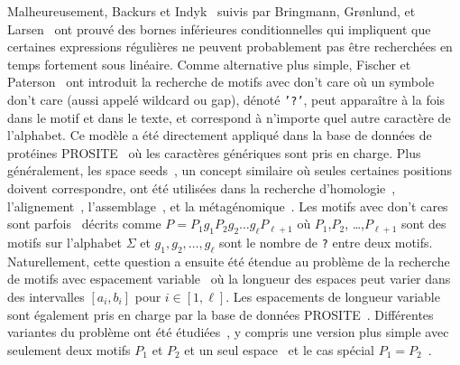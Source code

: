 Malheureusement, Backurs et Indyk~\cite{DBLP:conf/focs/BackursI16} suivis par Bringmann, Gr{\o}nlund, et Larsen~\cite{8104068} ont prouvé des bornes inférieures conditionnelles qui impliquent que certaines expressions régulières ne peuvent probablement pas être recherchées en temps fortement sous linéaire.
Comme alternative plus simple, Fischer et Paterson~\cite{FischerPaterson} ont introduit la recherche de motifs avec \og{}don't care\fg{} où un symbole don't care (aussi appelé wildcard ou gap), dénoté \texttt{'?'}, peut apparaître à la fois dans le motif et dans le texte, et correspond à n'importe quel autre caractère de l'alphabet.
Ce modèle a été directement appliqué dans la base de données de protéines PROSITE~\cite{hulo2006prosite} où les caractères génériques sont pris en charge. Plus généralement, les space seeds~\cite{li2004patternhunter}, un concept similaire où seules certaines positions doivent correspondre, ont été utilisées dans la recherche d'homologie~\cite{ma2002patternhunter}, l'alignement~\cite{david2011shrimp2}, l'assemblage~\cite{birol2015spaced}, et la métagénomique~\cite{bvrinda2015spaced}.
Les motifs avec don't cares sont parfois~\cite{lewenstein2011indexing} décrits comme $P= P_1g_1P_2g_2 \dots g_\ell P_{\ell+1}$ où $P_1$,$P_2$, \dots,$P_{\ell+1}$ sont des motifs sur l'alphabet $\Sigma$ et $g_1,g_2,\dots,g_{\ell}$ sont le nombre de \texttt{?} entre deux motifs. 
Naturellement, cette question a ensuite été étendue au problème de la recherche de motifs avec espacement variable~\cite{bille2012string,bille2014string} où la longueur des espaces peut varier dans des intervalles $[a_i,b_i]$ pour $i\in[1,\ell]$.
Les espacements de longueur variable sont également pris en charge par la base de données PROSITE~\cite{hulo2006prosite}.
Différentes variantes du problème ont été étudiées~\cite{kopelowitz2016color,cohen2009range,brodal1999finding}, y compris une version plus simple avec seulement deux motifs $P_1$ et $P_2$ et un seul espace~\cite{peterlongo2006gapped,iliopoulos2009indexing} et le cas spécial $P_1=P_2$~\cite{muthukrishnan2002efficient,keller2007range}.

